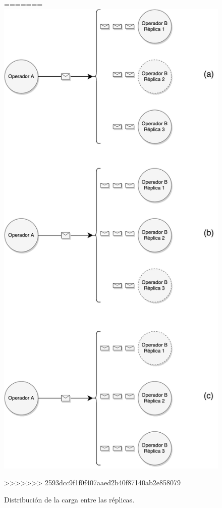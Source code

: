 \begin{figure}[!ht]
=======
		\includegraphics[scale=0.4]{images/DistribucionCarga.pdf}
	\caption{Distribuci\'on de la carga entre las r\'eplicas.}
>>>>>>> 2593dcc9f1f0f407aaed2b40f87140ab2e858079
	\label{fig:distCarga}
\end{figure}


